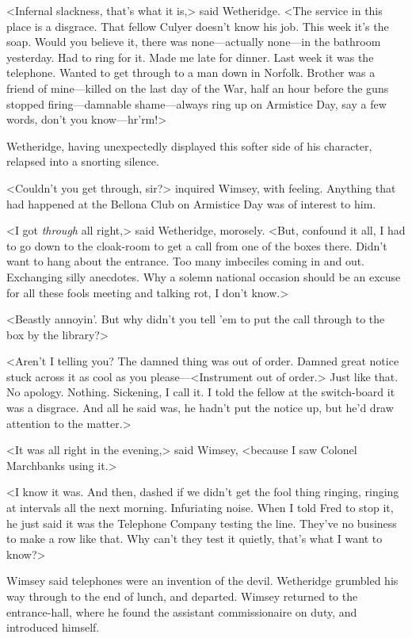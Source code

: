 <Infernal slackness, that's what it is,> said Wetheridge. <The service in this place is a disgrace. That fellow Culyer doesn't know his job. This week it's the soap. Would you believe it, there was none—actually none—in the bathroom yesterday. Had to ring for it. Made me late for dinner. Last week it was the telephone. Wanted to get through to a man down in Norfolk. Brother was a friend of mine—killed on the last day of the War, half an hour before the guns stopped firing—damnable shame—always ring up on Armistice Day, say a few words, don't you know—hr'rm!>

Wetheridge, having unexpectedly displayed this softer side of his character, relapsed into a snorting silence.

<Couldn't you get through, sir?> inquired Wimsey, with feeling. Anything that had happened at the Bellona Club on Armistice Day was of interest to him.

<I got \emph{through} all right,> said Wetheridge, morosely. <But, confound it all, I had to go down to the cloak-room to get a call from one of the boxes there. Didn't want to hang about the entrance. Too many imbeciles coming in and out. Exchanging silly anecdotes. Why a solemn national occasion should be an excuse for all these fools meeting and talking rot, I don't know.>

<Beastly annoyin'. But why didn't you tell 'em to put the call through to the box by the library?>

<Aren't I telling you? The damned thing was out of order. Damned great notice stuck across it as cool as you please—<Instrument out of order.> Just like that. No apology. Nothing. Sickening, I call it. I told the fellow at the switch-board it was a disgrace. And all he said was, he hadn't put the notice up, but he'd draw attention to the matter.>

<It was all right in the evening,> said Wimsey, <because I saw Colonel Marchbanks using it.>

<I know it was. And then, dashed if we didn't get the fool thing ringing, ringing at intervals all the next morning. Infuriating noise. When I told Fred to stop it, he just said it was the Telephone Company testing the line. They've no business to make a row like that. Why can't they test it quietly, that's what I want to know?>

Wimsey said telephones were an invention of the devil. Wetheridge grumbled his way through to the end of lunch, and departed. Wimsey returned to the entrance-hall, where he found the assistant commissionaire on duty, and introduced himself.

